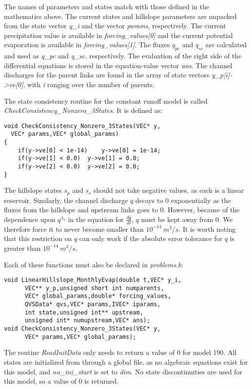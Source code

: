 \documentclass[12pt]{article}
\begin{document}
The names of parameters and states match with those defined in the mathematics above. The current states and hillslope parameters are unpacked from the state vector \emph{y\_i} and the vector \emph{params}, respectively. The current precipitation value is available in \emph{forcing\_values[0]} and the current potential evaporation is available in \emph{forcing\_values[1]}. The fluxes $q_{pc}$ and $q_{sc}$ are calculated and used as \emph{q\_pc} and \emph{q\_sc}, respectively. The evaluation of the right side of the differential equations is stored in the equation-value vector \emph{ans}. The channel discharges for the parent links are found in the array of state vectors \emph{y\_p[i]->ve[0]}, with \emph{i} ranging over the number of parents.

The state consistency routine for the constant runoff model is called \emph{CheckConsistency\_Nonzero\_3States}. It is defined as:
\begin{lstlisting}[style=CStyle]
void CheckConsistency_Nonzero_3States(VEC* y,
  VEC* params,VEC* global_params)
{
	if(y->ve[0] < 1e-14)	y->ve[0] = 1e-14;
	if(y->ve[1] < 0.0)	y->ve[1] = 0.0;
	if(y->ve[2] < 0.0)	y->ve[2] = 0.0;
}
\end{lstlisting}
The hillslope states $s_p$ and $s_s$ should not take negative values, as each is a linear reservoir. Similarly, the channel discharge $q$ decays to 0 exponentially as the fluxes from the hillslope and upstream links goes to 0. However, because of the dependence upon $q^{\lambda_1}$ in the equation for $\frac{dq}{dt}$, $q$ must be kept away from 0. We therefore force it to never become smaller than $10^{-14}\ m^3/s$. It is worth noting that this restriction on $q$ can only work if the absolute error tolerance for $q$ is greater than $10^{-14}\ m^3/s$.

Each of these functions must also be declared in \emph{problems.h}:
\begin{lstlisting}[style=CStyle]
void LinearHillslope_MonthlyEvap(double t,VEC* y_i,
      VEC** y_p,unsigned short int numparents,
      VEC* global_params,double* forcing_values,
      QVSData* qvs,VEC* params,IVEC* iparams,
      int state,unsigned int** upstream,
      unsigned int* numupstream,VEC* ans);
void CheckConsistency_Nonzero_3States(VEC* y,
      VEC* params,VEC* global_params);
\end{lstlisting}

The routine \emph{ReadInitData} only needs to return a value of 0 for model 190. All states are initialized from through a global file, as no algebraic equations exist for this model, and \emph{no\_ini\_start} is set to \emph{dim}. No state discontinuities are used for this model, so a value of 0 is returned.
\end{document}
